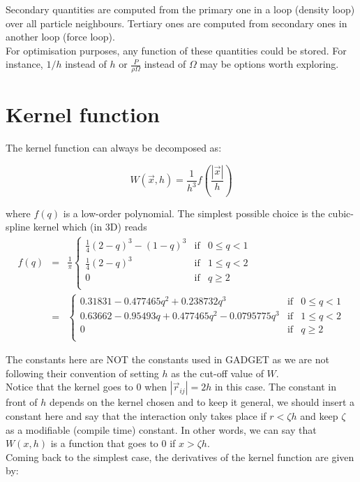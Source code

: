 \documentclass[a4paper,10pt]{report}
\begin{document}
Secondary quantities are computed from the primary one in a loop (density loop) over all particle neighbours. Tertiary
ones are computed from secondary ones in another loop (force loop). \\

For optimisation purposes, any function of these quantities could be stored. For instance, $1/h$ instead of $h$ or
$\frac{P}{\rho\Omega}$ instead of $\Omega$ may be options worth exploring. \\

\section{Kernel function}

The kernel function can always be decomposed as:

\begin{equation}
 W(\vec{x}, h) = \frac{1}{h^3}f\left(\frac{|\vec{x}|}{h}\right) 
\end{equation}

where $f(q)$ is a low-order polynomial. The simplest possible choice is the cubic-spline kernel which (in 3D) reads
\begin{eqnarray*}
 f(q) &=& \frac{1}{\pi}\left\lbrace \begin{array}{rcl}
                      \frac{1}{4}(2-q)^3 - (1-q)^3 & \mbox{if} & 0 \leq q < 1 \\
		      \frac{1}{4}(2-q)^3 & \mbox{if} & 1 \leq q < 2 \\
		      0 & \mbox{if} & q \geq 2 \\
                     \end{array}
 \right. \\
&=&\left\lbrace \begin{array}{rcl}
    0.31831 -0.477465 q^2+0.238732 q^3& \mbox{if} & 0 \leq q < 1 \\
   0.63662 -0.95493 q+0.477465 q^2-0.0795775 q^3  & \mbox{if} & 1 \leq q < 2 \\
		      0 & \mbox{if} & q \geq 2 \\
                     \end{array}
 \right.
\end{eqnarray*}

The constants here are NOT the constants used in GADGET as we are not following their convention of setting $h$ as the
cut-off value of $W$.\\
Notice that the kernel goes to $0$ when $|\vec{r}_{ij}| = 2h$ in this case. The constant in front of $h$ depends on the
kernel
chosen and to keep it general, we should insert a constant here and say that the interaction only takes place if
$r<\zeta h$ and keep $\zeta$ as a modifiable (compile time) constant. In other words, we can say that $W(x,h)$ is a
function that goes to $0$ if $x > \zeta h$. \\
Coming back to the simplest case, the derivatives of the kernel function are given by:
\end{document}
